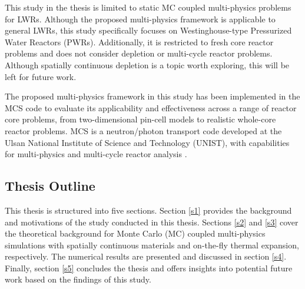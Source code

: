 This study in the thesis is limited to static MC coupled multi-physics problems for LWRs. Although the proposed multi-physics framework is applicable to general LWRs, this study specifically focuses on Westinghouse-type Pressurized Water Reactors (PWRs). Additionally, it is restricted to fresh core reactor problems and does not consider depletion or multi-cycle reactor problems. Although spatially continuous depletion is a topic worth exploring, this will be left for future work.

The proposed multi-physics framework in this study has been implemented in the MCS code \cite{hlee_2020} to evaluate its applicability and effectiveness across a range of reactor core problems, from two-dimensional pin-cell models to realistic whole-core reactor problems. MCS is a neutron/photon transport code developed at the Ulsan National Institute of Science and Technology (UNIST), with capabilities for multi-physics and multi-cycle reactor analysis \cite{hlee_2017, yu_2019, yu_2020}.

\subsection{Thesis Outline}

This thesis is structured into five sections. Section \ref{s1} provides the background and motivations of the study conducted in this thesis. Sections \ref{s2} and \ref{s3} cover the theoretical background for Monte Carlo (MC) coupled multi-physics simulations with spatially continuous materials and on-the-fly thermal expansion, respectively. The numerical results are presented and discussed in section \ref{s4}. Finally, section \ref{s5} concludes the thesis and offers insights into potential future work based on the findings of this study.